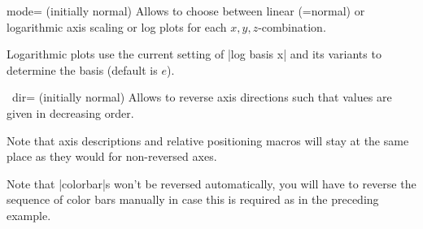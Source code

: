 \begin{pgfplotsxykey}{\x mode= (initially normal)}
    Allows to choose between linear (=normal) or logarithmic axis scaling or
    log plots for each $x,y,z$-combination.

    Logarithmic plots use the current setting of |log basis x| and its variants
    to determine the basis (default is $e$).
\end{pgfplotsxykey}

\begin{pgfplotsxykey}{\x\ dir= (initially normal)}
\label{key:pgfplots:xydir}%
    Allows to reverse axis directions such that values are given in decreasing
    order.
\begin{codeexample}[]
\end{codeexample}

\begin{codeexample}[]
\end{codeexample}

    Note that axis descriptions and relative positioning macros will stay at
    the same place as they would for non-reversed axes.
\begin{codeexample}[]
\end{codeexample}

    Note that |colorbar|s won't be reversed automatically, you will have to
    reverse the sequence of color bars manually in case this is required as in
    the preceding example.
\end{pgfplotsxykey}

